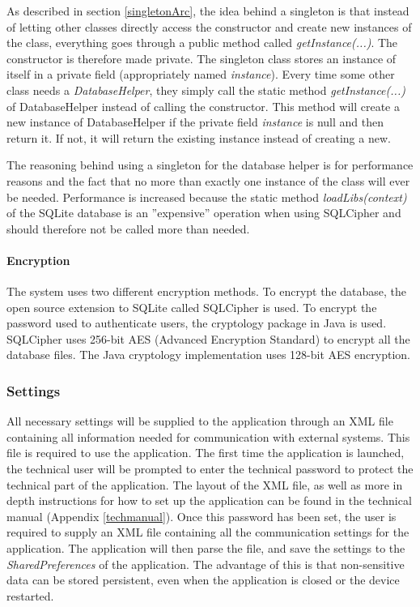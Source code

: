 \noindent
As described in section \ref{singletonArc}, the idea behind a singleton is that instead of letting other classes directly access the constructor and create new instances of the class, everything goes through a public method called \emph{getInstance(...)}. The constructor is therefore made private. The singleton class stores an instance of itself in a private field (appropriately named \emph{instance}). Every time some other class needs a \emph{DatabaseHelper}, they simply call the static method \emph{getInstance(...)} of DatabaseHelper instead of calling the constructor. This method will create a new instance of DatabaseHelper if the private field \emph{instance} is null and then return it. If not, it will return the existing instance instead of creating a new.

The reasoning behind using a singleton for the database helper is for performance reasons and the fact that no more than exactly one instance of the class will ever be needed. Performance is increased because the static method \emph{loadLibs(context)} of the SQLite database is an ''expensive'' operation when using SQLCipher and should therefore not be called more than needed.

\paragraph{Encryption}
The system uses two different encryption methods. To encrypt the database, the open source extension to SQLite called SQLCipher is used. To encrypt the password used to authenticate users, the cryptology package in Java is used. SQLCipher uses 256-bit AES (Advanced Encryption Standard) to encrypt all the database files. The Java cryptology implementation uses 128-bit AES encryption.

\subsubsection{Settings}

All necessary settings will be supplied to the application through an XML file containing all information needed for communication with external systems. This file is required to use the application. The first time the application is launched, the technical user will be prompted to enter the technical password to protect the technical part of the application. The layout of the XML file, as well as more in depth instructions for how to set up the application can be found in the technical manual (Appendix \ref{techmanual}). Once this password has been set, the user is required to supply an XML file containing all the communication settings for the application. The application will then parse the file, and save the settings to the \emph{SharedPreferences} of the application. The advantage of this is that non-sensitive data can be stored persistent, even when the application is closed or the device restarted.

